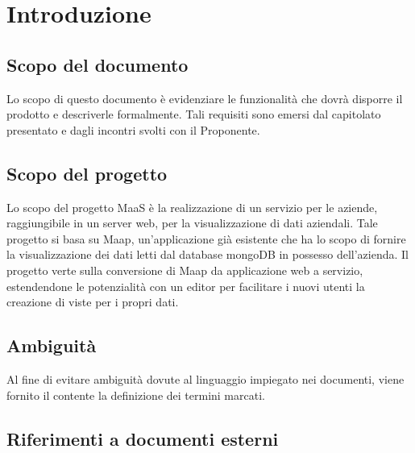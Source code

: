 \section{Introduzione}
\subsection{Scopo del documento}
Lo scopo di questo documento è evidenziare le funzionalit\`a che dovr\`a disporre il prodotto e descriverle formalmente. Tali requisiti sono emersi dal capitolato presentato e dagli incontri svolti con il Proponente.

\subsection{Scopo del progetto}
Lo scopo del progetto MaaS è la realizzazione di un servizio per le aziende, raggiungibile in un server web, per la visualizzazione di dati aziendali. Tale progetto si basa su Maap, un'applicazione già esistente che ha lo scopo di fornire la visualizzazione dei dati letti dal database mongoDB in possesso dell'azienda. Il progetto verte sulla conversione di Maap da applicazione web a servizio, estendendone le potenzialità con un editor per facilitare i nuovi utenti la creazione di viste per i propri dati.

\subsection{Ambiguit\`a}
Al fine di evitare ambiguità dovute al linguaggio impiegato nei documenti, viene fornito il \Glossario contente la definizione dei termini marcati.

\subsection{Riferimenti a documenti esterni}

